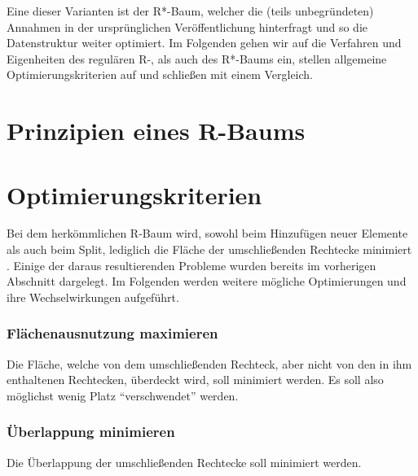 \documentclass[runningheads,a4paper]{llncs}
\begin{document}
	Eine dieser Varianten ist der R*-Baum, welcher die (teils unbegründeten) Annahmen in der ursprünglichen Veröffentlichung hinterfragt und so die Datenstruktur weiter optimiert. Im Folgenden gehen wir auf die Verfahren und Eigenheiten des regulären R-, als auch des R*-Baums ein, stellen allgemeine Optimierungskriterien auf und schließen mit einem Vergleich.


\section{Prinzipien eines R-Baums} %
\label{sec:prinzipien_eines_r_baums}



\section{Optimierungskriterien} %
\label{sec:optimierungskriterien}

	Bei dem herkömmlichen R-Baum wird, sowohl beim Hinzufügen neuer Elemente als auch beim Split, lediglich die Fläche der umschließenden Rechtecke minimiert \citep[vgl.][50-51]{Guttman:1984}. Einige der daraus resultierenden Probleme wurden bereits im vorherigen Abschnitt dargelegt.
	Im Folgenden werden weitere mögliche Optimierungen und ihre Wechselwirkungen aufgeführt.

	\subsubsection{Flächenausnutzung maximieren} %
	\label{sub:flaechenausnutzung}

	Die Fläche, welche von dem umschließenden Rechteck, aber nicht von den in ihm enthaltenen Rechtecken, überdeckt wird, soll minimiert werden. Es soll also möglichst wenig Platz \enquote{verschwendet} werden.


	\subsubsection{Überlappung minimieren} %
	\label{sub:ueberlappung_minimieren}

	Die Überlappung der umschließenden Rechtecke soll minimiert werden.
	
\end{document}
